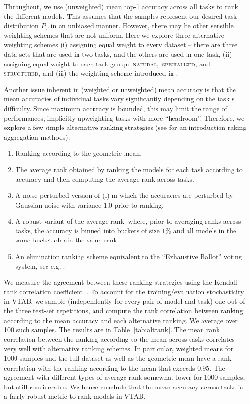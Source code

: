 \documentclass{article}
\DeclareRobustCommand{\taskNatural}{\raisebox{0.5pt}{\tikz{\fill[natural] (0cm,0cm) circle (.5ex);}}\,\textsc{natural}}
\DeclareRobustCommand{\taskSpecialized}{\raisebox{0.5pt}{\tikz{\fill[specialized] (0,0) circle (.5ex);}}\,\textsc{specialized}}
\DeclareRobustCommand{\taskStructured}{\raisebox{0.5pt}{\tikz{\fill[structured] (0,0) circle (.5ex);}}\,\textsc{structured}}
\begin{document}
Throughout, we use (unweighted) mean top-1 accuracy across all tasks to rank the  different models. This assumes that the samples represent our desired task distribution $P_T$ in an unbiased manner. However, there may be other sensible weighting schemes that are not uniform. Here we explore three alternative  weighting schemes (i) assigning equal weight to every dataset -- there are three data sets that are used in two tasks, and the others are used in one task, (ii) assigning equal weight to each task group: \taskNatural{}, \taskSpecialized{}, and \taskStructured{}, and (iii) the weighting scheme introduced in \citet{balduzzi2018}.

Another issue inherent in (weighted or unweighted) mean accuracy is that the mean accuracies of individual tasks vary significantly depending on the task's difficulty. Since maximum accuracy is bounded, this may limit the range of performances, implicitly upweighting tasks with more ``headroom''. Therefore, we explore a few simple alternative ranking strategies (see \citet{dwork2001rank} for an introduction raking aggregation methods): 
\begin{enumerate}[label=(\roman*)]
\item Ranking according to the geometric mean.
\item The average rank obtained by ranking the models for each task according to accuracy and then computing the average rank across tasks.
\item A noise-perturbed version of (i) in which the accuracies are perturbed by Gaussian noise with variance $1.0$ prior to ranking.
\item A robust variant of the average rank, where, prior to averaging ranks across tasks, the accuracy is binned into buckets of size $1\%$ and all models in the same bucket obtain the same rank.
\item An elimination ranking scheme equivalent to the ``Exhaustive Ballot'' voting system, see e.g. \citep{shahandashti2016electoral}.
\end{enumerate}
We measure the agreement between these ranking strategies using the Kendall rank correlation coefficient~\citep{kendall1945treatment}. To account for the training/evaluation stochasticity in VTAB, we sample (independently for every pair of model and task) one out of the three test-set repetitions, and compute the rank correlation between ranking according to the mean accuracy and each alternative ranking. We average over 100 such samples. The results are in Table~\ref{tab:altrank}. The mean rank correlation between the ranking according to the mean across tasks correlates very well with alternative ranking schemes. In particular, weighted means for 1000 samples and the full dataset as well as the geometric mean have a rank correlation with the ranking according to the mean that exceeds $0.95$. The agreement with different types of average rank somewhat lower for 1000 samples, but still considerable. We hence conclude that the mean accuracy across tasks is a fairly robust metric to rank models in VTAB.
\end{document}
